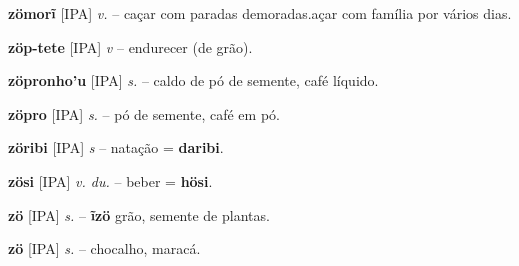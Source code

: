 \textbf{zömorĩ} [IPA] \textit{v.} -- caçar com paradas demoradas.açar com família por vários dias.

\textbf{zöp-tete} [IPA] \textit{v} -- {endurecer (de grão)}.

\textbf{zöpronho'u} [IPA] \textit{s.} -- caldo de pó de semente, café líquido.

\textbf{zöpro} [IPA] \textit{s.} -- pó de semente, café em pó.

\textbf{zöribi} [IPA] \textit{s} -- natação = \textbf{daribi}.

\textbf{zösi} [IPA] \textit{v. du.} -- beber = \textbf{hösi}.

\textbf{zö} [IPA] \textit{s.} -- \textbf{ĩzö} grão, semente de plantas.

\textbf{zö} [IPA] \textit{s.} -- chocalho, maracá.



